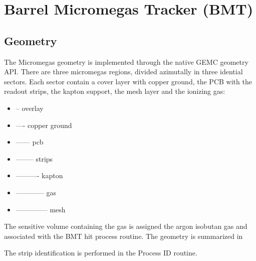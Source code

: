\section{Barrel Micromegas Tracker (BMT)}

\subsection{Geometry}

The Micromegas geometry is implemented through the native GEMC geometry API.
There are three micromegas regions, divided azimutally in three idential sectors. Each sector contain a cover layer with copper ground,
the PCB with the readout strips, the kapton support, the mesh layer and the ionizing gas:

\begin{itemize}
	\item -- overlay
	\item ---- copper ground
	\item ------ pcb
	\item -------- strips
	\item ---------- kapton
	\item ------------ gas
	\item -------------- mesh
\end{itemize}

The sensitive volume containing the gas is assigned the argon isobutan gas and associated with the BMT hit process routine.
The geometry is summarized in 

The strip identification is performed in the Process ID routine.

